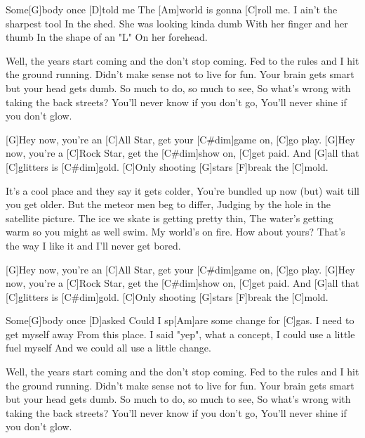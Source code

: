 

\begin{guitar}
	Some[G]body once [D]told me 
	The [Am]world is gonna [C]roll me.
	I ain't the sharpest tool
	In the shed.
	She was looking kinda dumb 
	With her finger and her thumb
	In the shape of an "L" 
	On her forehead.
	
	Well, the years start coming and the don't stop coming. 
	Fed to the rules and I hit the ground running.
	Didn't make sense not to live for fun. 
	Your brain gets smart but your head gets dumb.
	So much to do, so much to see,
	So what's wrong with taking the back streets?
	You'll never know if you don't go, 
	You'll never shine if you don't glow.
	
	[G]Hey now, you're an [C]All Star, get your [C#dim]game on, [C]go play.
	[G]Hey now, you're a [C]Rock Star, get the [C#dim]show on, [C]get paid.
	And [G]all that [C]glitters is [C#dim]gold.
	[C]Only shooting [G]stars [F]break the [C]mold.
	
	It's a cool place and they say it gets colder,
	You're bundled up now (but) wait till you get older.
	But the meteor men beg to differ, 
	Judging by the hole in the satellite picture.
	The ice we skate is getting pretty thin, 
	The water's getting warm so you might as well swim.
	My world's on fire. How about yours? 
	That's the way I like it and I'll never get bored.
	
	 
	
	
	[G]Hey now, you're an [C]All Star, get your [C#dim]game on, [C]go play.
	[G]Hey now, you're a [C]Rock Star, get the [C#dim]show on, [C]get paid.
	And [G]all that [C]glitters is [C#dim]gold.
	[C]Only shooting [G]stars [F]break the [C]mold.
	
	Some[G]body once [D]asked 
	Could I sp[Am]are some change for [C]gas.
	I need to get myself away
	From this place.
	I said "yep", what a concept, 
	I could use a little fuel myself
	And we could all use a little change.
	
	Well, the years start coming and the don't stop coming. 
	Fed to the rules and I hit the ground running.
	Didn't make sense not to live for fun. 
	Your brain gets smart but your head gets dumb.
	So much to do, so much to see,
	So what's wrong with taking the back streets?
	You'll never know if you don't go, 
	You'll never shine if you don't glow.
	
	 
	
\end{guitar}
